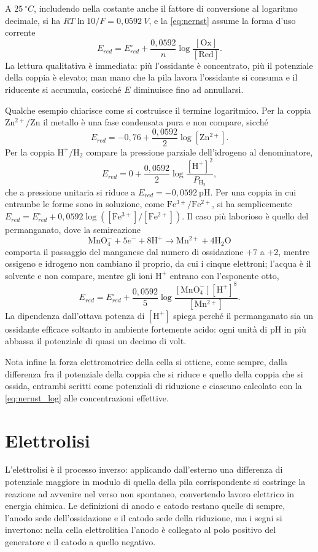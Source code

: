 A $25 \ ^\circ C$, includendo nella costante anche il fattore di conversione al logaritmo decimale, si ha $RT \ln 10 / F = 0{,}0592 \ V$, e la \eqref{eq:nernst} assume la forma d'uso corrente
\begin{equation}
    E_{red} = E^\circ_{red} + \frac{0{,}0592}{n} \log \frac{[\mathrm{Ox}]}{[\mathrm{Red}]} .
    \label{eq:nernst_log}
\end{equation}
La lettura qualitativa è immediata: più l'ossidante è concentrato, più il potenziale della coppia è elevato; man mano che la pila lavora l'ossidante si consuma e il riducente si accumula, cosicché $E$ diminuisce fino ad annullarsi.
 
Qualche esempio chiarisce come si costruisce il termine logaritmico.
Per la coppia $\mathrm{Zn^{2+}}/\mathrm{Zn}$ il metallo è una fase condensata pura e non compare, sicché
\[
    E_{red} = -0{,}76 + \frac{0{,}0592}{2} \log [\mathrm{Zn^{2+}}] .
\]
Per la coppia $\mathrm{H^+}/\mathrm{H_2}$ compare la pressione parziale dell'idrogeno al denominatore,
\[
    E_{red} = 0 + \frac{0{,}0592}{2} \log \frac{[\mathrm{H^+}]^2}{P_{\mathrm{H_2}}} ,
\]
che a pressione unitaria si riduce a $E_{red} = -0{,}0592 \ \mathrm{pH}$.
Per una coppia in cui entrambe le forme sono in soluzione, come $\mathrm{Fe^{3+}}/\mathrm{Fe^{2+}}$, si ha semplicemente $E_{red} = E^\circ_{red} + 0{,}0592 \log([\mathrm{Fe^{3+}}]/[\mathrm{Fe^{2+}}])$.
Il caso più laborioso è quello del permanganato, dove la semireazione
\[
    \mathrm{MnO_4^-} + 5e^- + 8\mathrm{H^+} \longrightarrow \mathrm{Mn^{2+}} + 4\mathrm{H_2O}
\]
comporta il passaggio del manganese dal numero di ossidazione $+7$ a $+2$, mentre ossigeno e idrogeno non cambiano il proprio, da cui i cinque elettroni; l'acqua è il solvente e non compare, mentre gli ioni $\mathrm{H^+}$ entrano con l'esponente otto,
\[
    E_{red} = E^\circ_{red} + \frac{0{,}0592}{5} \log \frac{[\mathrm{MnO_4^-}][\mathrm{H^+}]^8}{[\mathrm{Mn^{2+}}]} .
\]
La dipendenza dall'ottava potenza di $[\mathrm{H^+}]$ spiega perché il permanganato sia un ossidante efficace soltanto in ambiente fortemente acido: ogni unità di $\mathrm{pH}$ in più abbassa il potenziale di quasi un decimo di volt.
 
Nota infine la forza elettromotrice della cella si ottiene, come sempre, dalla differenza fra il potenziale della coppia che si riduce e quello della coppia che si ossida, entrambi scritti come potenziali di riduzione e ciascuno calcolato con la \eqref{eq:nernst_log} alle concentrazioni effettive.

\section{Elettrolisi}
 
L'elettrolisi è il processo inverso: applicando dall'esterno una differenza di potenziale maggiore in modulo di quella della pila corrispondente si costringe la reazione ad avvenire nel verso non spontaneo, convertendo lavoro elettrico in energia chimica.
Le definizioni di anodo e catodo restano quelle di sempre, l'anodo sede dell'ossidazione e il catodo sede della riduzione, ma i segni si invertono: nella cella elettrolitica l'anodo è collegato al polo positivo del generatore e il catodo a quello negativo.
 